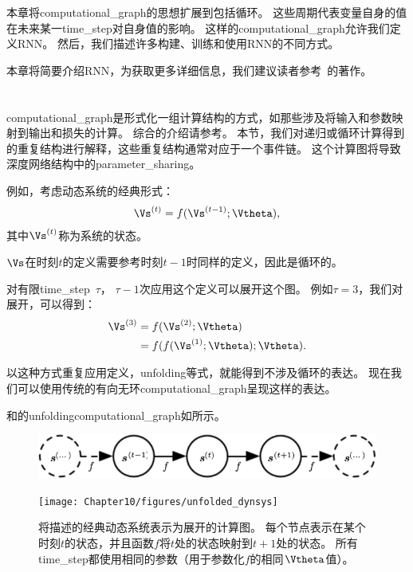 本章将\gls{computational_graph}的思想扩展到包括循环。
这些周期代表变量自身的值在未来某一\gls{time_step}对自身值的影响。
这样的\gls{computational_graph}允许我们定义\gls{RNN}。
然后，我们描述许多构建、训练和使用\gls{RNN}的不同方式。

本章将简要介绍\gls{RNN}，为获取更多详细信息，我们建议读者参考~\cite{Graves-2012}的著作。


\section{}
\label{sec:unfolding_computational_graphs}
\gls{computational_graph}是形式化一组计算结构的方式，如那些涉及将输入和参数映射到输出和损失的计算。
综合的介绍请参考。
本节，我们对递归或循环计算得到的重复结构进行解释，这些重复结构通常对应于一个事件链。
这个计算图将导致深度网络结构中的\gls{parameter_sharing}。

例如，考虑动态系统的经典形式：
\begin{align}
\label{eq:101s}
\Vs^{(t)} = f(\Vs^{(t-1)}; \Vtheta),
\end{align}
其中$ \Vs^{(t)}$称为系统的状态。

$\Vs$在时刻$t$的定义需要参考时刻$t-1$时同样的定义，因此是循环的。

对有限\gls{time_step}~$\tau$， $\tau-1$次应用这个定义可以展开这个图。
例如$\tau = 3$，我们对展开，可以得到：
\begin{align}
 \Vs^{(3)} &= f(\Vs^{(2)}; \Vtheta) \\
 & = f(f(\Vs^{(1)}; \Vtheta) ; \Vtheta).
  \label{eq:103s}
\end{align}

以这种方式重复应用定义，\gls{unfolding}等式，就能得到不涉及循环的表达。
现在我们可以使用传统的有向无环\gls{computational_graph}呈现这样的表达。

和的\gls{unfolding}\gls{computational_graph}如所示。
\begin{figure}[!htb]
\ifOpenSource
\centerline{\includegraphics[scale=0.5]{images/89.png}}
\else
\centerline{\texttt{[image: Chapter10/figures/unfolded\_dynsys]}}
\fi
\caption{将描述的经典动态系统表示为展开的计算图。
每个节点表示在某个时刻$t$的状态，并且函数$f$将$t$处的状态映射到$t+1$处的状态。
所有\gls{time_step}都使用相同的参数（用于参数化$f$的相同$\Vtheta$值）。
}
\label{fig:chap10_unfolded_dynsys}
\end{figure}

